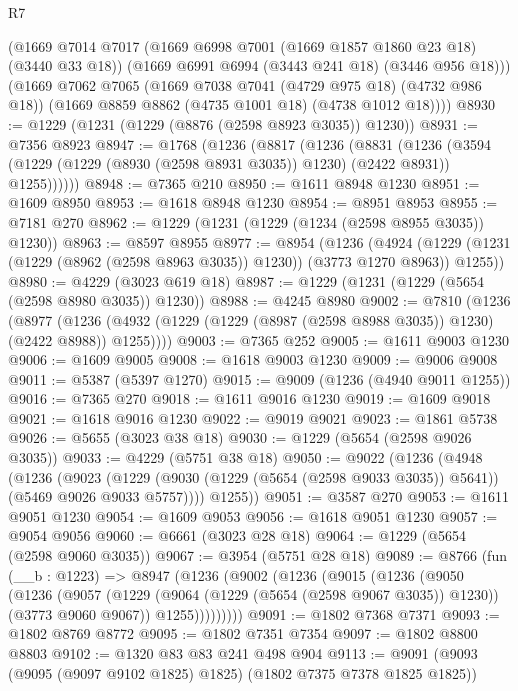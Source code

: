 \begin{lexlean}{R7}
\begin{coremodule}
      (@1669
        @7014
        @7017
        (@1669 @6998 @7001 (@1669 @1857 @1860 @23 @18) (@3440 @33 @18))
        (@1669 @6991 @6994 (@3443 @241 @18) (@3446 @956 @18)))
      (@1669
        @7062
        @7065
        (@1669 @7038 @7041 (@4729 @975 @18) (@4732 @986 @18))
        (@1669 @8859 @8862 (@4735 @1001 @18) (@4738 @1012 @18))))
@8930 := @1229 (@1231 (@1229 (@8876 (@2598 @8923 @3035)) @1230))
@8931 := @7356 @8923
@8947 := @1768
    (@1236
      (@8817
        (@1236
          (@8831
            (@1236
              (@3594 (@1229 (@1229 (@8930 (@2598 @8931 @3035)) @1230) (@2422 @8931)) @1255))))))
@8948 := @7365 @210
@8950 := @1611 @8948 @1230
@8951 := @1609 @8950
@8953 := @1618 @8948 @1230
@8954 := @8951 @8953
@8955 := @7181 @270
@8962 := @1229 (@1231 (@1229 (@1234 (@2598 @8955 @3035)) @1230))
@8963 := @8597 @8955
@8977 := @8954
    (@1236
      (@4924 (@1229 (@1231 (@1229 (@8962 (@2598 @8963 @3035)) @1230)) (@3773 @1270 @8963)) @1255))
@8980 := @4229 (@3023 @619 @18)
@8987 := @1229 (@1231 (@1229 (@5654 (@2598 @8980 @3035)) @1230))
@8988 := @4245 @8980
@9002 := @7810
    (@1236
      (@8977 (@1236 (@4932 (@1229 (@1229 (@8987 (@2598 @8988 @3035)) @1230) (@2422 @8988)) @1255))))
@9003 := @7365 @252
@9005 := @1611 @9003 @1230
@9006 := @1609 @9005
@9008 := @1618 @9003 @1230
@9009 := @9006 @9008
@9011 := @5387 (@5397 @1270)
@9015 := @9009 (@1236 (@4940 @9011 @1255))
@9016 := @7365 @270
@9018 := @1611 @9016 @1230
@9019 := @1609 @9018
@9021 := @1618 @9016 @1230
@9022 := @9019 @9021
@9023 := @1861 @5738
@9026 := @5655 (@3023 @38 @18)
@9030 := @1229 (@5654 (@2598 @9026 @3035))
@9033 := @4229 (@5751 @38 @18)
@9050 := @9022
    (@1236
      (@4948
        (@1236
          (@9023
            (@1229 (@9030 (@1229 (@5654 (@2598 @9033 @3035)) @5641)) (@5469 @9026 @9033 @5757))))
        @1255))
@9051 := @3587 @270
@9053 := @1611 @9051 @1230
@9054 := @1609 @9053
@9056 := @1618 @9051 @1230
@9057 := @9054 @9056
@9060 := @6661 (@3023 @28 @18)
@9064 := @1229 (@5654 (@2598 @9060 @3035))
@9067 := @3954 (@5751 @28 @18)
@9089 := @8766
    (fun (__b : @1223) =>
    @8947
      (@1236
        (@9002
          (@1236
            (@9015
              (@1236
                (@9050
                  (@1236
                    (@9057
                      (@1229 (@9064 (@1229 (@5654 (@2598 @9067 @3035)) @1230)) (@3773 @9060 @9067))
                      @1255)))))))))
@9091 := @1802 @7368 @7371
@9093 := @1802 @8769 @8772
@9095 := @1802 @7351 @7354
@9097 := @1802 @8800 @8803
@9102 := @1320 @83 @83 @241 @498 @904
@9113 := @9091 (@9093 (@9095 (@9097 @9102 @1825) @1825) (@1802 @7375 @7378 @1825 @1825))

\end{coremodule}
\end{lexlean}

